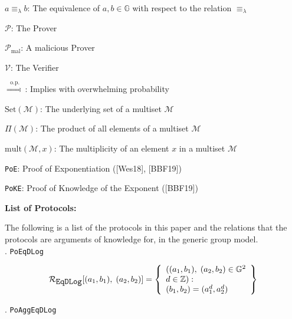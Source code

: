 \documentclass[11pt, lettersize, notitlepage, leqno, footskip=0.6cm]{article}
\newcommand{\sett}{\mr{Set}}
\newcommand{\impop}{\overset{\;\;\mr{o.p.}\;\;}{\Longrightarrow}}
\newcommand{\eqlam}{\equiv_{\lam}}
\newcommand{\mc}{\mathcal}
\newcommand{\mb}{\mathbb}
\newcommand{\mr}{\mathrm}
\newcommand{\lam}{\lambda}
\newcommand{\noin}{\noindent}
\numberwithin{equation}{section}
\begin{document}
{\noindent $a\eqlam b$: The equivalence of $a,b\in\mb{G}$ with respect to the relation $\eqlam$ \vspace{0.1cm}

\noin $\mc{P}$: The Prover \vspace{0.1cm}

\noin $\mc{P}_{\mr{mal}}$: A malicious Prover \vspace{0.1cm}

\noin $\mc{V}$: The Verifier \vspace{0.1cm}

\noin $\impop$: Implies with overwhelming probability \vspace{0.1cm}

\noin $\sett(\mc{M})$: The underlying set of a multiset $\mc{M}$ \vspace{0.1cm}

\noin $\Pi(\mc{M})$: The product of all elements of a multiset $\mc{M}$ \vspace{0.1cm}

\noin $\mr{mult}(\mc{M},x)$: The multiplicity of an element $x$ in a multiset $\mc{M}$ \vspace{0.1cm}

\noin \verb|PoE|: Proof of Exponentiation ([Wes18], [BBF19])

\noin \verb|PoKE|: Proof of Knowledge of the Exponent ([BBF19])

\bigskip \begin{center} \textbf{List of Protocols:}




\end{center}

The following is a list of the protocols in this paper and the relations that the protocols are arguments of knowledge for, in the generic group model.\\

\noin 1. \verb|PoEqDLog| \vspace{-0.3cm}

\[
  \mc{R}_{{\protect\verb|EqDLog|}}[(a_1, b_1),\;(a_2,b_2)] = \left\{\begin{array}{l}
    ((a_1, b_1), \; (a_2,b_2)\in\mb{G}^2\\
    d\in\mb{Z}): \\
    (b_1,b_2) = (a_1^d,a_2^d)
  \end{array}\right\}
\]

\noin 2. \verb|PoAggEqDLog| \vspace{-0.3cm}

}
\end{document}
